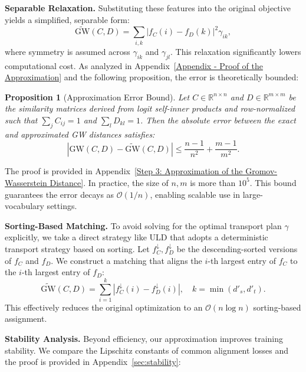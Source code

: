 \documentclass{article}
\newtheorem{proposition}{Proposition}
\begin{document}
\textbf{Separable Relaxation.}
Substituting these features into the original objective yields a simplified, separable form:
\begin{equation}
\widetilde{\text{GW}}(C, D) = \sum_{i,k} |f_C(i) - f_D(k)|^2 \gamma_{ik},
\end{equation}
where symmetry is assumed across $\gamma_{ik}$ and $\gamma_{jl}$. This relaxation significantly lowers computational cost. As analyzed in Appendix~\ref{Appendix - Proof of the Approximation} and the following proposition, the error is theoretically bounded:

\begin{proposition}[Approximation Error Bound]
\label{proposition1}
Let $C \in \mathbb{R}^{n \times n}$ and $D \in \mathbb{R}^{m \times m}$ be the similarity matrices derived from logit self-inner products and row-normalized such that $\sum_{j} C_{ij} = 1$ and $\sum_{l} D_{kl} = 1$. Then the absolute error between the exact and approximated GW distances satisfies:
\begin{equation}
|\text{GW}(C, D) - \widetilde{\text{GW}}(C, D)| \leq \frac{n - 1}{n^2} + \frac{m - 1}{m^2}.
\end{equation}
\end{proposition}

The proof is provided in Appendix~\ref{Step 3: Approximation of the Gromov-Wasserstein Distance}. In practice, the size of $n,m$ is more than $10^5$.
This bound guarantees the error decays as $\mathcal{O}(1/n)$, enabling scalable use in large-vocabulary settings.

\textbf{Sorting-Based Matching.}
To avoid solving for the optimal transport plan $\gamma$ explicitly, we take a direct strategy like ULD \cite{boizardtowards} that adopts a deterministic transport strategy based on sorting. Let $f_C^{\downarrow}, f_D^{\downarrow}$ be the descending-sorted versions of $f_C$ and $f_D$. We construct a matching that aligns the $i$-th largest entry of $f_C$ to the $i$-th largest entry of $f_D$:
\begin{equation}
\widetilde{\text{GW}}(C, D) = \sum_{i=1}^{k} \left| f_C^{\downarrow}(i) - f_D^{\downarrow}(i) \right|, \quad k = \min(d'_s, d'_t).
\end{equation}
This effectively reduces the original optimization to an $\mathcal{O}(n \log n)$ sorting-based assignment.

\textbf{Stability Analysis.}
Beyond efficiency, our approximation improves training stability. We compare the Lipschitz constants of common alignment losses and the proof is provided in Appendix~\ref{sec:stability}:
\end{document}
